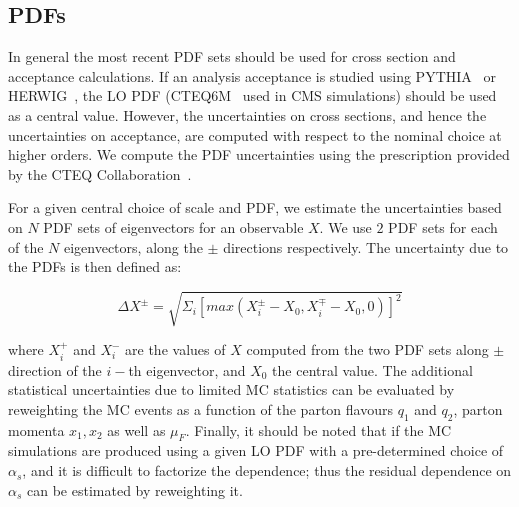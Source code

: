 \subsection{PDFs}
In general the most recent PDF sets should be used for cross section and 
acceptance calculations. If an analysis acceptance is studied using 
PYTHIA~\cite{Pythia} or HERWIG~\cite{Herwig}, the LO PDF (CTEQ6M~\cite{cteq6m} 
used in CMS simulations) should be used as a central value. However, the 
uncertainties on cross sections, and hence the uncertainties on acceptance, are 
computed with respect to the nominal choice at higher orders. %
We compute the PDF uncertainties using the prescription provided by the CTEQ 
Collaboration~\cite{cteq6m}. 

For a given central choice of scale and PDF, we estimate the uncertainties 
based on $N$ PDF sets of eigenvectors for an observable $X$. We use $2$ PDF 
sets for each of the $N$ eigenvectors, along the $\pm$ directions respectively. 
The uncertainty due to the PDFs is then defined as:

\begin{equation}
	\Delta X^{\pm} = \sqrt{\Sigma_i [max(X_i^\pm-X_0,X_i^\mp-X_0,0)]^2 }
\end{equation}

where $X_i^+$ and $X_i^-$ are the values of $X$ computed from the two PDF sets 
along $\pm$ direction of the $i-$th eigenvector, and $X_0$ the central value. 
The additional statistical 
uncertainties due to limited MC statistics can be evaluated by reweighting the 
MC events as a function of the parton flavours $q_1$ and $q_2$, parton momenta 
$x_1, x_2$ as well as $\mu_F$. Finally, it should be noted that if the MC
simulations are produced using a given LO PDF with a pre-determined choice of 
$\alpha_s$, and it is difficult to factorize the dependence; thus the residual 
dependence on $\alpha_s$ can be estimated by reweighting it.
